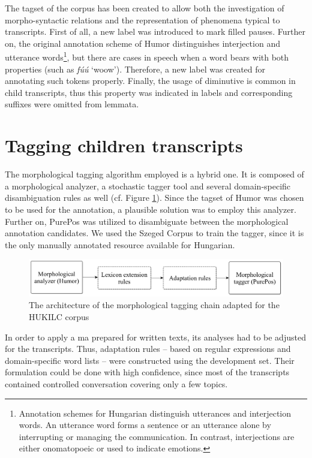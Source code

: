The tagset of the corpus has been created to allow both the investigation of morpho-syntactic relations and the representation of phenomena typical to transcripts. 
First of all, a new label was introduced to mark filled pauses. 
Further on, the original annotation scheme of Humor distinguishes interjection and utterance words\footnote{Annotation schemes for Hungarian distinguish utterances and interjection words. An utterance word forms a sentence or an utterance alone by interrupting or managing the communication. In contrast, interjections are either onomatopoeic or used to indicate emotions.},
but there are cases in speech when a word bears with both properties (such as \textit{fúú} `woow’). 
Therefore, a new label was created for annotating such tokens properly. 
Finally, the usage of diminutive is common in child transcripts, thus this property was indicated in labels and corresponding suffixes were omitted from lemmata.

\section{Tagging children transcripts}
\label{sec:ch-tagging}
The morphological tagging algorithm employed is a hybrid one. 
It is composed of a morphological analyzer, a stochastic tagger tool and several domain-specific disambiguation rules as well (cf. Figure \ref{fig:speech-tagger}). 
Since the tagset of Humor was chosen to be used for the annotation, a plausible solution was to employ this analyzer. 
Further on, PurePos was utilized to disambiguate between the morphological annotation candidates. 
We used the Szeged Corpus \cite{Csendes2004} to train the tagger, since it is the only manually annotated resource available for Hungarian. 

\begin{figure}[H]
  \centering
  \includegraphics[scale=0.2]{MorphComplexity/mlu_architecture.png} 
  \caption{The architecture of the morphological tagging chain adapted for the HUKILC corpus}
  \label{fig:speech-tagger}
\end{figure}


In order to apply a \acrlong{ma} prepared for written texts, its analyses had to be adjusted for the transcripts. 
Thus, adaptation rules -- based on regular expressions and domain-specific word lists -- were constructed using the development set.
Their formulation could be done with high confidence, since most of the transcripts contained controlled conversation covering only a few topics. 

